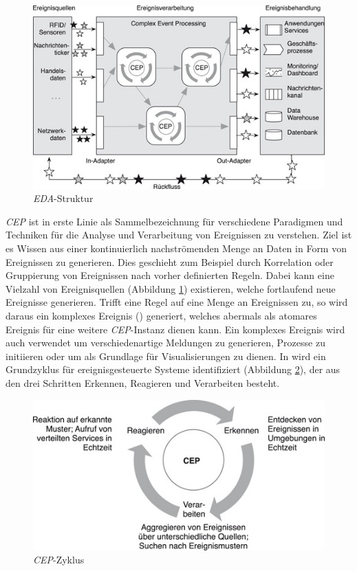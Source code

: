 \documentclass{acm_proc_article-sp}
\begin{document}
\begin{figure}[H]
    \centering
    \includegraphics[width=\linewidth]{img/eda-struktur-bruns.jpg}
    \caption{\textit{EDA}-Struktur}
    \label{img:eda-struktur}
\end{figure}

\textit{CEP} ist in erste Linie als Sammelbezeichnung für verschiedene Paradigmen und 
Techniken für die Analyse und Verarbeitung von Ereignissen zu verstehen. Ziel ist es 
Wissen aus einer kontinuierlich nachströmenden Menge an Daten in Form von Ereignissen zu 
generieren. Dies geschieht zum Beispiel durch Korrelation oder Gruppierung von 
Ereignissen nach vorher definierten Regeln. Dabei kann eine Vielzahl von 
Ereignisquellen (Abbildung \ref{img:eda-struktur}) existieren, welche fortlaufend neue 
Ereignisse generieren. Trifft eine Regel auf eine Menge an Ereignissen zu, so wird daraus 
ein komplexes Ereignis (\cite{glossary}) generiert, welches abermals als atomares 
Ereignis für eine weitere 
\textit{CEP}-Instanz dienen kann. Ein komplexes Ereignis wird auch verwendet
um verschiedenartige Meldungen zu generieren, Prozesse zu initiieren oder um als 
Grundlage 
für Visualisierungen zu dienen. In \cite{bruns} wird ein Grundzyklus für 
ereignisgesteuerte Systeme identifiziert (Abbildung \ref{img:cep-zyklus}), der aus den 
drei Schritten Erkennen, Reagieren und Verarbeiten besteht.

\begin{figure}[H]
    \centering
    \includegraphics[width=\linewidth]{img/cep-zyklus-bruns.jpg}
    \caption{\textit{CEP}-Zyklus}
    \label{img:cep-zyklus}
\end{figure}
\end{document}
